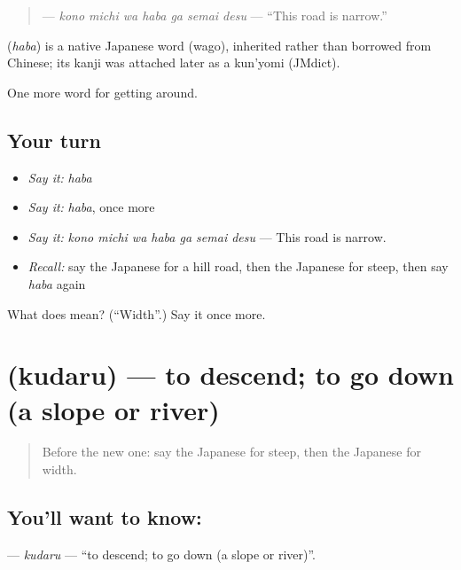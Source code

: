 \begin{quote}
\textbf{   } — \emph{kono michi wa haba ga semai desu} — \textquotedblleft{}This road is narrow.\textquotedblright{}
\end{quote}

\begin{cousinweb}
\textbf{} (\emph{haba}) is a native Japanese word (wago), inherited rather than borrowed from Chinese; its kanji was attached later as a kun'yomi (JMdict).
\end{cousinweb}

\begin{grammarlens}[title={What you've built}]
One more word for getting around.
\end{grammarlens}

\subsection*{Your turn}
\begin{itemize}
\raggedright
  \item \emph{Say it:} \emph{haba}
  \item \emph{Say it:} \emph{haba}, once more
  \item \emph{Say it:} \emph{kono michi wa haba ga semai desu} — This road is narrow.
  \item \emph{Recall:} say the Japanese for a hill road, then the Japanese for steep, then say \emph{haba} again
\end{itemize}

\begin{tcolorbox}[breakable,colback=teal!4,colframe=teal!35!black,title={Before you move on}]
What does  mean? (\textquotedblleft{}Width\textquotedblright{}.) Say it once more.
\end{tcolorbox}
\section[\texorpdfstring{\ja{くだる} (kudaru)}{くだる (kudaru)}]{ (kudaru) — to descend; to go down (a slope or river)}

\label{lesson:JA-C394-kudaru}



\begin{quote}
Before the new one: say the Japanese for steep, then the Japanese for width.
\end{quote}

\subsection*{You'll want to know: }
\textbf{} — \emph{kudaru} — \textquotedblleft{}to descend; to go down (a slope or river)\textquotedblright{}.

